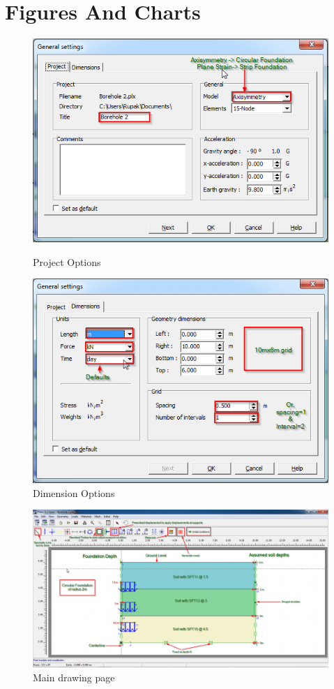 \chapter{Figures And Charts}

\begin{figure}[hbtp]
  \centering
  \includegraphics[height=0.33\textheight]{images/plx/a (1).png}
  \caption{Project Options}
  \vfill
  \includegraphics[height=0.33\textheight]{images/plx/a (2).png}
  \caption{Dimension Options}
\end{figure}
\break
\begin{landscape}
\begin{figure}[hbtp]
  \centering
  \includegraphics[width=\linewidth, height=\textheight,keepaspectratio]{images/plx/a (4).png}
  \caption{Main drawing page}
\end{figure}
\end{landscape}
